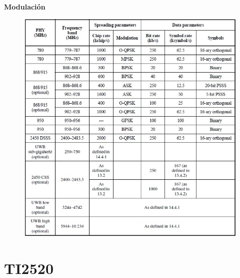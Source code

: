 \documentclass[aspectratio=169]{beamer}
\begin{document}
\begin{frame}{\textbf{Modulación}}
\begin{minipage}[c]{1.0\linewidth}
\begin{figure}[H]
	\includegraphics[height=1\textheight]{./imagenes/modulaciones.jpg}
		\end{figure}	
\end{minipage}
\end{frame}

\section{TI2520}
\end{document}
